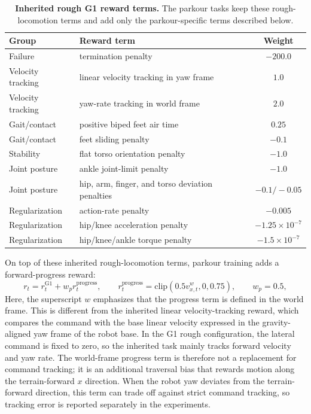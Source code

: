 \documentclass{article}
\begin{document}
\begin{table}[t]
    \caption{\textbf{Inherited rough G1 reward terms.} The parkour tasks keep these rough-locomotion terms and add only the parkour-specific terms described below.}
    \label{tab:inherited-g1-rewards}
    \centering
    \begin{tabular}{llc}
        \toprule
        Group & Reward term & Weight \\
        \midrule
        Failure & termination penalty & $-200.0$ \\
        Velocity tracking & linear velocity tracking in yaw frame & $1.0$ \\
        Velocity tracking & yaw-rate tracking in world frame & $2.0$ \\
        Gait/contact & positive biped feet air time & $0.25$ \\
        Gait/contact & feet sliding penalty & $-0.1$ \\
        Stability & flat torso orientation penalty & $-1.0$ \\
        Joint posture & ankle joint-limit penalty & $-1.0$ \\
        Joint posture & hip, arm, finger, and torso deviation penalties & $-0.1/-0.05$ \\
        Regularization & action-rate penalty & $-0.005$ \\
        Regularization & hip/knee acceleration penalty & $-1.25\times10^{-7}$ \\
        Regularization & hip/knee/ankle torque penalty & $-1.5\times10^{-7}$ \\
        \bottomrule
    \end{tabular}
\end{table}

On top of these inherited rough-locomotion terms, parkour training adds a forward-progress reward:
\begin{equation}
    r_t = r_t^{\mathrm{G1}} + w_p r_t^{\mathrm{progress}},
    \qquad
    r_t^{\mathrm{progress}} = \mathrm{clip}(0.5 v_{x,t}^{w}, 0, 0.75),
    \qquad
    w_p = 0.5,
\end{equation}
Here, the superscript $w$ emphasizes that the progress term is defined in the world frame. This is different from the inherited linear velocity-tracking reward, which compares the command with the base linear velocity expressed in the gravity-aligned yaw frame of the robot base. In the G1 rough configuration, the lateral command is fixed to zero, so the inherited task mainly tracks forward velocity and yaw rate. The world-frame progress term is therefore not a replacement for command tracking; it is an additional traversal bias that rewards motion along the terrain-forward $x$ direction. When the robot yaw deviates from the terrain-forward direction, this term can trade off against strict command tracking, so tracking error is reported separately in the experiments.
\end{document}
